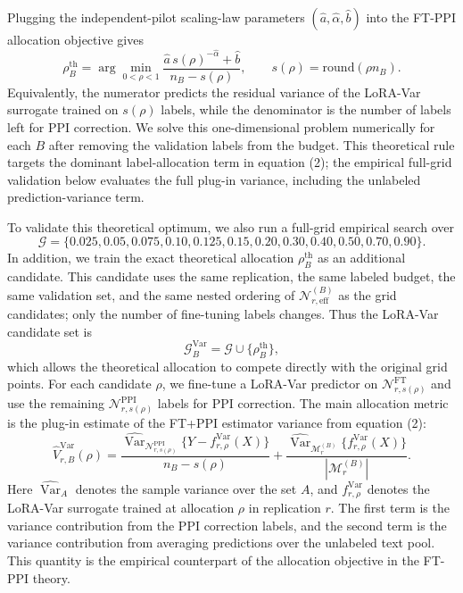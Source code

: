 \documentclass[11pt]{article}
\newcommand{\Var}{\operatorname{Var}}
\begin{document}
Plugging the independent-pilot scaling-law parameters $(\hat a,\hat\alpha,\hat b)$ into the
FT-PPI allocation objective gives
\[
    \rho_B^{\mathrm{th}}
    =
    \arg\min_{0<\rho<1}
    \frac{
        \hat a\,s(\rho)^{-\hat\alpha}+\hat b
    }{
        n_B-s(\rho)
    },
    \qquad s(\rho)=\mathrm{round}(\rho n_B).
\label{eq:target_theoretical_allocation}
\]
Equivalently, the numerator predicts the residual variance of the LoRA-Var surrogate trained on
$s(\rho)$ labels, while the denominator is the number of labels left for PPI correction. We solve
this one-dimensional problem numerically for each $B$ after removing the validation labels from
the budget. This theoretical rule targets the dominant label-allocation term in equation (2);
the empirical full-grid validation below evaluates the full plug-in variance, including the
unlabeled prediction-variance term.

To validate this theoretical optimum, we also run a full-grid empirical search over
\[
    \mathcal{G}
    =
    \{0.025,0.05,0.075,0.10,0.125,0.15,0.20,0.30,0.40,0.50,0.70,0.90\}.
\]
In addition, we train the exact theoretical allocation $\rho_B^{\mathrm{th}}$ as an additional
candidate. This candidate uses the same replication, the same labeled budget, the same validation
set, and the same nested ordering of $\mathcal{N}_{r,\mathrm{eff}}^{(B)}$ as the grid candidates;
only the number of fine-tuning labels changes. Thus the LoRA-Var candidate set is
\[
    \mathcal{G}_B^{\mathrm{Var}}
    =
    \mathcal{G}\cup\{\rho_B^{\mathrm{th}}\},
\]
which allows the theoretical allocation to compete directly with the original grid points. For
each candidate $\rho$, we fine-tune a LoRA-Var predictor on
$\mathcal{N}_{r,s(\rho)}^{\mathrm{FT}}$ and use the remaining
$\mathcal{N}_{r,s(\rho)}^{\mathrm{PPI}}$ labels for PPI correction. The main allocation metric is
the plug-in estimate of the FT+PPI estimator variance from equation (2):
\[
    \widehat V_{r,B}^{\mathrm{Var}}(\rho)
    =
    \frac{
        \widehat{\Var}_{\mathcal{N}_{r,s(\rho)}^{\mathrm{PPI}}}
        \{Y-f_{r,\rho}^{\mathrm{Var}}(X)\}
    }{
        n_B-s(\rho)
    }
    +
    \frac{
        \widehat{\Var}_{\mathcal{M}_r^{(B)}}\{f_{r,\rho}^{\mathrm{Var}}(X)\}
    }{
        |\mathcal{M}_r^{(B)}|
    } . 
    \label{eq:full_grid_plugin_variance}
\]
Here $\widehat{\Var}_{A}$ denotes the sample variance over the set $A$, and
$f_{r,\rho}^{\mathrm{Var}}$ denotes the LoRA-Var surrogate trained at allocation $\rho$ in
replication $r$. The first term is the variance contribution from the PPI correction labels, and
the second term is the variance contribution from averaging predictions over the unlabeled text
pool. This quantity is the empirical counterpart of the allocation objective in the FT-PPI
theory.
\end{document}
